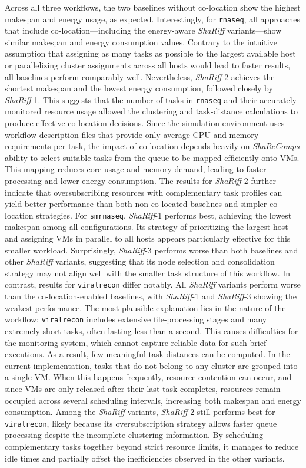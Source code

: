 Across all three workflows, the two baselines without co-location show the highest makespan and energy usage, as expected. Interestingly, for \texttt{rnaseq}, all approaches that include co-location—including the energy-aware \textit{ShaRiff} variants—show similar makespan and energy consumption values. Contrary to the intuitive assumption that assigning as many tasks as possible to the largest available host or parallelizing cluster assignments across all hosts would lead to faster results, all baselines perform comparably well. Nevertheless, \textit{ShaRiff}-2 achieves the shortest makespan and the lowest energy consumption, followed closely by \textit{ShaRiff}-1. This suggests that the number of tasks in \texttt{rnaseq} and their accurately monitored resource usage allowed the clustering and task-distance calculations to produce effective co-location decisions. Since the simulation environment uses workflow description files that provide only average CPU and memory requirements per task, the impact of co-location depends heavily on \textit{ShaReComps} ability to select suitable tasks from the queue to be mapped efficiently onto VMs. This mapping reduces core usage and memory demand, leading to faster processing and lower energy consumption. The results for \textit{ShaRiff}-2 further indicate that oversubscribing resources with complementary task profiles can yield better performance than both non-co-located baselines and simpler co-location strategies.
For \texttt{smrnaseq}, \textit{ShaRiff}-1 performs best, achieving the lowest makespan among all configurations. Its strategy of prioritizing the largest host and assigning VMs in parallel to all hosts appears particularly effective for this smaller workload. Surprisingly, \textit{ShaRiff}-3 performs worse than both baselines and other \textit{ShaRiff} variants, suggesting that its node selection and consolidation strategy may not align well with the smaller task structure of this workflow.
In contrast, results for \texttt{viralrecon} differ notably. All \textit{ShaRiff} variants perform worse than the co-location-enabled baselines, with \textit{ShaRiff}-1 and \textit{ShaRiff}-3 showing the weakest performance. The most plausible explanation lies in the nature of the workflow: \texttt{viralrecon} includes extensive file-processing stages and many extremely short tasks, often lasting less than a second. This causes difficulties for the monitoring system, which cannot capture reliable data for such brief executions. As a result, few meaningful task distances can be computed. In the current implementation, tasks that do not belong to any cluster are grouped into a single VM. When this happens frequently, resource contention can occur, and since VMs are only released after their last task completes, resources remain occupied across several scheduling intervals, increasing both makespan and energy consumption.
Among the \textit{ShaRiff} variants, \textit{ShaRiff}-2 still performs best for \texttt{viralrecon}, likely because its oversubscription strategy allows faster queue processing despite the incomplete clustering information. By scheduling complementary tasks together beyond strict resource limits, it manages to reduce idle times and partially offset the inefficiencies observed in the other variants.

